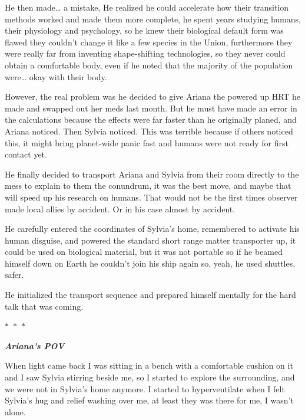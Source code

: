 \documentclass[colorlinks,12pt,a4paper]{book}
\newcommand\sep{\begin{center}
  \boldmath $\ast$~$\ast$~$\ast$
\end{center}}
\begin{document}
He then made… a mistake, He realized he could accelerate how their transition methods worked and 
made them more complete, he spent years studying humans, their physiology and psychology, so he knew their 
biological default form was flawed they couldn't change it like a few species in the Union, furthermore they were really far 
from inventing shape-shifting technologies, so they never could obtain a comfortable body, even if he noted
 that the majority of the population were… okay with their body. \par
 \bigskip

However, the real problem was he decided to give Ariana the powered up HRT he made and 
swapped out her meds last month. But he must have made an error in the calculations because the effects 
were far faster than he originally planed, and Ariana noticed. Then Sylvia noticed. This was terrible
 because if others noticed this, it might bring planet-wide panic fast and humans were not ready for first contact yet.\par
 \bigskip

He finally decided to transport Ariana and Sylvia from their room directly to the mess to explain to them the conundrum, 
it was the best move, and maybe that will speed up his research on humans. That would not be the first times 
observer made local allies by accident. Or in his case almost by accident. \par
\bigskip

He carefully entered the coordinates of Sylvia's home, remembered to activate his human disguise, 
and powered the standard short range matter transporter up, it could be used on biological material, 
but it was not portable so if he beamed himself down on Earth he couldn't join his ship again so, yeah, he used shuttles,
  safer.\par
  \bigskip

He initialized the transport sequence and prepared himself mentally for the hard talk that was coming.

\sep

\textit{\textbf{Ariana's POV}}\par
\bigskip

When light came back I was sitting in a bench with a comfortable cushion on it and I saw Sylvia stirring 
beside me, so I started to explore the surrounding, and we were not in Sylvia's home anymore. 
I started to hyperventilate when I felt Sylvia's hug and relief washing over me, at least they was there for me, 
I wasn't alone.\par
\bigskip
\end{document}
